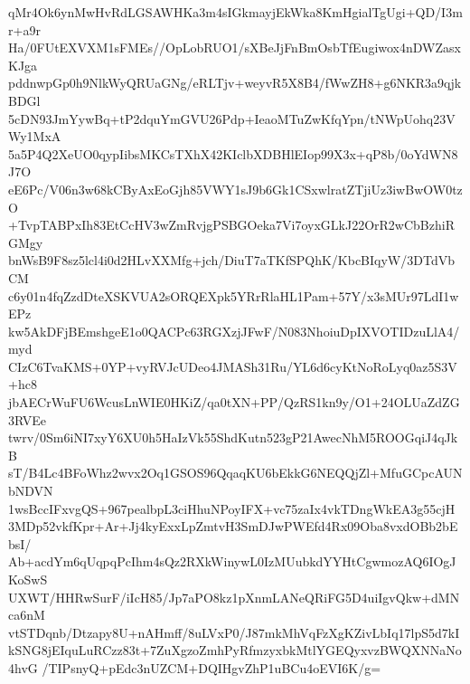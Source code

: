 qMr4Ok6ynMwHvRdLGSAWHKa3m4sIGkmayjEkWka8KmHgialTgUgi+QD/I3mr+a9r
Ha/0FUtEXVXM1sFMEs//OpLobRUO1/sXBeJjFnBmOsbTfEugiwox4nDWZasxKJga
pddnwpGp0h9NlkWyQRUaGNg/eRLTjv+weyvR5X8B4/fWwZH8+g6NKR3a9qjkBDGl
5cDN93JmYywBq+tP2dquYmGVU26Pdp+IeaoMTuZwKfqYpn/tNWpUohq23VWy1MxA
5a5P4Q2XeUO0qypIibsMKCsTXhX42KIclbXDBHlEIop99X3x+qP8b/0oYdWN8J7O
eE6Pc/V06n3w68kCByAxEoGjh85VWY1sJ9b6Gk1CSxwlratZTjiUz3iwBwOW0tzO
+TvpTABPxIh83EtCcHV3wZmRvjgPSBGOeka7Vi7oyxGLkJ22OrR2wCbBzhiRGMgy
bnWsB9F8sz5lcl4i0d2HLvXXMfg+jch/DiuT7aTKfSPQhK/KbcBIqyW/3DTdVbCM
c6y01n4fqZzdDteXSKVUA2sORQEXpk5YRrRlaHL1Pam+57Y/x3sMUr97LdI1wEPz
kw5AkDFjBEmshgeE1o0QACPc63RGXzjJFwF/N083NhoiuDpIXVOTIDzuLlA4/myd
CIzC6TvaKMS+0YP+vyRVJcUDeo4JMASh31Ru/YL6d6cyKtNoRoLyq0az5S3V+hc8
jbAECrWuFU6WcusLnWIE0HKiZ/qa0tXN+PP/QzRS1kn9y/O1+24OLUaZdZG3RVEe
twrv/0Sm6iNI7xyY6XU0h5HaIzVk55ShdKutn523gP21AwecNhM5ROOGqiJ4qJkB
sT/B4Lc4BFoWhz2wvx2Oq1GSOS96QqaqKU6bEkkG6NEQQjZl+MfuGCpcAUNbNDVN
1wsBccIFxvgQS+967pealbpL3ciHhuNPoyIFX+vc75zaIx4vkTDngWkEA3g55cjH
3MDp52vkfKpr+Ar+Jj4kyExxLpZmtvH3SmDJwPWEfd4Rx09Oba8vxdOBb2bEbsI/
Ab+acdYm6qUqpqPcIhm4sQz2RXkWinywL0IzMUubkdYYHtCgwmozAQ6IOgJKoSwS
UXWT/HHRwSurF/iIcH85/Jp7aPO8kz1pXnmLANeQRiFG5D4uiIgvQkw+dMNca6nM
vtSTDqnb/Dtzapy8U+nAHmff/8uLVxP0/J87mkMhVqFzXgKZivLbIq17lpS5d7kI
kSNG8jEIquLuRCzz83t+7ZuXgzoZmhPyRfmzyxbkMtlYGEQyxvzBWQXNNaNo4hvG
/TIPsnyQ+pEdc3nUZCM+DQIHgvZhP1uBCu4oEVI6K/g=
